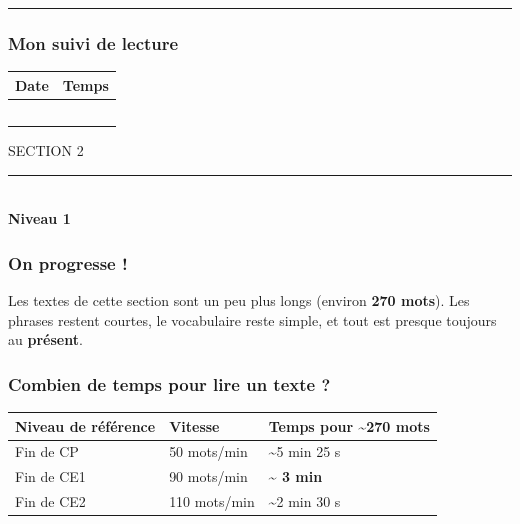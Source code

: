 \documentclass[
  french,
  14pt,
  a4paper,
]{extarticle}
\newcounter{none} %
\newcommand{\sectiondivider}[2]{%
  \vspace*{2cm}%
  \begin{center}
    {\fontsize{18pt}{22pt}\selectfont\textcolor{accentcolor}{\MakeUppercase{Section #1}}}\\[0.6em]
    \textcolor{accentcolor}{\rule{0.35\textwidth}{1.5pt}}\\[1em]
    {\fontsize{38pt}{44pt}\selectfont\bfseries #2}
  \end{center}
  \vspace{1.5cm}
}
\begin{document}
\begin{center}\rule{0.5\linewidth}{0.5pt}\end{center}

\subsubsection{Mon suivi de lecture}\label{mon-suivi-de-lecture-3}

\begin{center}
\begin{tabularx}{0.75\textwidth}{|X|X|}
\hline
\textbf{Date} & \textbf{Temps} \\
\hline
& \\
\hline
& \\
\hline
& \\
\hline
& \\
\hline
& \\
\hline
\end{tabularx}
\end{center}

\newpage

\sectiondivider{2}{Niveau 1}

\subsubsection{On progresse !}\label{on-progresse}

Les textes de cette section sont un peu plus longs (environ \textbf{270
mots}). Les phrases restent courtes, le vocabulaire reste simple, et
tout est presque toujours au \textbf{présent}.

\subsubsection{Combien de temps pour lire un texte
?}\label{combien-de-temps-pour-lire-un-texte-1}

{\def\LTcaptype{none} %
\begin{longtable}[]{@{}lll@{}}
\toprule\noalign{}
Niveau de référence & Vitesse & Temps pour \textasciitilde270 mots \\
\midrule\noalign{}
\endhead
\bottomrule\noalign{}
\endlastfoot
Fin de CP & 50 mots/min & \textasciitilde5 min 25 s \\
Fin de CE1 & 90 mots/min & \textbf{\textasciitilde{} 3 min} \\
Fin de CE2 & 110 mots/min & \textasciitilde2 min 30 s \\
\end{longtable}
}
\end{document}
